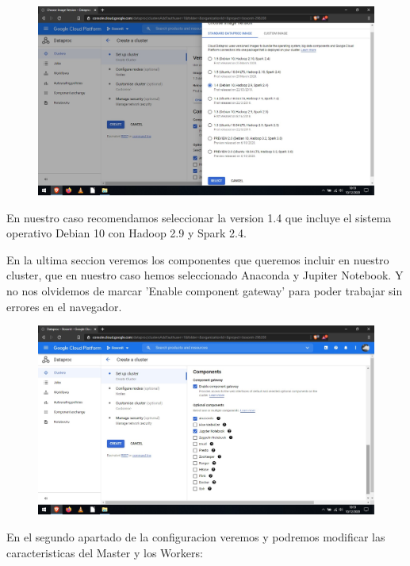 \documentclass[a4paper,10pt]{article}
\begin{document}
\begin{figure}[H]
\begin{center}
\includegraphics[width=500pt]{./fotos/GoogleCloud/25 - GC.jpg}
\end{center}
\end{figure}

En nuestro caso recomendamos seleccionar la version 1.4 que incluye el sistema operativo Debian 10 con Hadoop 2.9 y Spark 2.4.

En la ultima seccion veremos los componentes que queremos incluir en nuestro cluster, que en nuestro caso hemos seleccionado Anaconda y Jupiter Notebook. Y no nos olvidemos de marcar 'Enable component gateway' para poder trabajar sin errores en el navegador.

\begin{figure}[H]
\begin{center}
\includegraphics[width=500pt]{./fotos/GoogleCloud/26 - GC.jpg}
\end{center}
\end{figure}

En el segundo apartado de la configuracion veremos y podremos modificar las caracteristicas del Master y los Workers:
\end{document}
